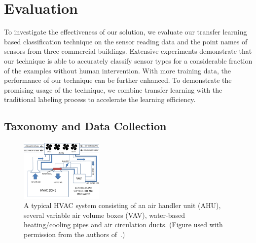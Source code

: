 \section{Evaluation}
To investigate the effectiveness of our solution, we evaluate our transfer learning based classification technique on the sensor reading data and the point names of sensors from three commercial buildings. Extensive experiments demonstrate that our technique is able to accurately classify sensor types for a considerable fraction of the examples without human intervention. With more training data, the performance of our technique can be further enhanced.
To demonstrate the promising usage of the technique, we combine transfer learning with the traditional labeling process to accelerate the learning efficiency.


\subsection{Taxonomy and Data Collection}
\begin{figure}[t]
\centering
\includegraphics[width=0.36\textwidth]{./fig/hvac}
\caption{A typical HVAC system consisting of an air handler unit (AHU), several variable air volume boxes (VAV), water-based heating/cooling pipes and air circulation ducts. (Figure used with permission from the authors of~\cite{sentinel}.)}
\label{fig:hvac}
\end{figure}


